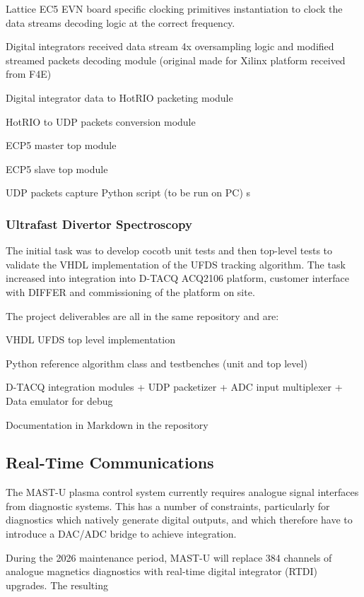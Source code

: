 \documentclass[preprint]{elsarticle}
\begin{document}
Lattice EC5 EVN board specific clocking primitives instantiation to clock the data streams decoding logic at the correct frequency. 

Digital integrators received data stream 4x oversampling logic and modified streamed packets decoding module (original made for Xilinx platform received from F4E) 

Digital integrator data to HotRIO packeting module 

HotRIO to UDP packets conversion module 

ECP5 master top module 

ECP5 slave top module 

UDP packets capture Python script (to be run on PC) 
s
\subsubsection{Ultrafast Divertor Spectroscopy}

The initial task was to develop cocotb unit tests and then top-level tests to validate the VHDL implementation of the UFDS tracking algorithm. The task increased into integration into D-TACQ ACQ2106 platform, customer interface with DIFFER and commissioning of the platform on site.

The project deliverables are all in the same repository and are:

VHDL UFDS top level implementation

Python reference algorithm class and testbenches (unit and top level)

D-TACQ integration modules + UDP packetizer + ADC input multiplexer + Data emulator for debug

Documentation in Markdown in the repository

\subsection{Real-Time Communications}

The MAST-U plasma control system currently requires analogue signal interfaces from diagnostic systems.
This has a number of constraints, particularly for diagnostics which natively generate digital outputs, and
which therefore have to introduce a DAC/ADC bridge to achieve integration.

During the 2026 maintenance period, MAST-U will replace 384 channels of analogue magnetics diagnostics with
real-time digital integrator (RTDI) upgrades.  The resulting
\end{document}
